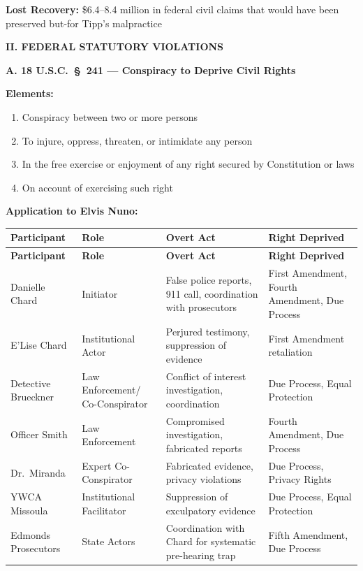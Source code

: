 \documentclass[11pt, letterpaper]{article}
\newcommand{\sectiontitle}[1]{\vspace{0.2in}\noindent\textcolor{NavyBlue}{\large\textbf{#1}}\vspace{0.1in}}
\newcommand{\subsectiontitle}[1]{\vspace{0.15in}\noindent\textcolor{NavyBlue}{\textbf{#1}}\vspace{0.05in}}
\begin{document}
\textbf{Lost Recovery:} \$6.4--8.4 million in federal civil claims that would have been preserved but-for Tipp's malpractice

\sectiontitle{II. FEDERAL STATUTORY VIOLATIONS}

\subsectiontitle{A. 18 U.S.C.\ \S\ 241 --- Conspiracy to Deprive Civil Rights}

\textbf{Elements:}
\begin{enumerate}[leftmargin=*,itemsep=2pt]
    \item Conspiracy between two or more persons
    \item To injure, oppress, threaten, or intimidate any person
    \item In the free exercise or enjoyment of any right secured by Constitution or laws
    \item On account of exercising such right
\end{enumerate}

\textbf{Application to Elvis Nuno:}

\begin{center}
\begin{longtable}{|p{1.0in}|p{1.0in}|p{1.5in}|p{1.6in}|}
\hline
\textbf{Participant} & \textbf{Role} & \textbf{Overt Act} & \textbf{Right Deprived} \\
\hline
\endfirsthead
\hline
\textbf{Participant} & \textbf{Role} & \textbf{Overt Act} & \textbf{Right Deprived} \\
\hline
\endhead
Danielle Chard & Initiator & False police reports, 911 call, coordination with prosecutors & First Amendment, Fourth Amendment, Due Process \\
\hline
E'Lise Chard & Institutional Actor & Perjured testimony, suppression of evidence & First Amendment retaliation \\
\hline
Detective Brueckner & Law Enforcement/ Co-Conspirator & Conflict of interest investigation, coordination & Due Process, Equal Protection \\
\hline
Officer Smith & Law Enforcement & Compromised investigation, fabricated reports & Fourth Amendment, Due Process \\
\hline
Dr.\ Miranda & Expert Co-Conspirator & Fabricated evidence, privacy violations & Due Process, Privacy Rights \\
\hline
YWCA Missoula & Institutional Facilitator & Suppression of exculpatory evidence & Due Process, Equal Protection \\
\hline
Edmonds Prosecutors & State Actors & Coordination with Chard for systematic pre-hearing trap & Fifth Amendment, Due Process \\
\hline
\end{longtable}
\end{center}
\end{document}
